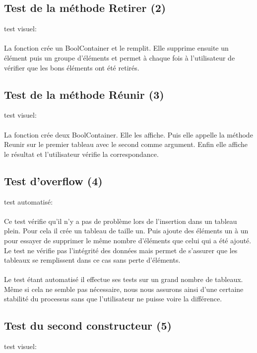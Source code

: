 \documentclass[a4paper, 12pts]{article}
\begin{document}
\subsection{Test de la méthode Retirer (2)}
test visuel:
\paragraph{}
La fonction crée un BoolContainer et le remplit. Elle supprime ensuite un élément puis un groupe d’éléments et permet à chaque fois à l’utilisateur de vérifier que les bons éléments ont été retirés.

\subsection{Test de la méthode Réunir (3)}
test visuel:
\paragraph{}
La fonction crée deux BoolContainer. Elle les affiche. Puis elle appelle la méthode Reunir sur le premier tableau avec le second comme argument. Enfin elle affiche le résultat et l’utilisateur vérifie la correspondance.

\subsection{Test d'overflow (4)}
test automatisé:
\paragraph{}
Ce test vérifie qu'il n'y a pas de problème lors de l'insertion dans un tableau plein. Pour cela il crée un tableau de taille un. Puis ajoute des éléments un à un pour essayer de supprimer le même nombre d’éléments que celui qui a été ajouté. Le test ne vérifie pas l’intégrité des données mais permet de s'assurer que les tableaux se remplissent dans ce cas sans perte d'éléments.
\paragraph{}
Le test étant automatisé il effectue ses tests sur un grand nombre de tableaux. Même si cela ne semble pas nécessaire, nous nous assurons ainsi d'une certaine stabilité du processus sans que l'utilisateur ne puisse voire la différence.

\subsection{Test du second constructeur (5)}
test visuel:
\end{document}
